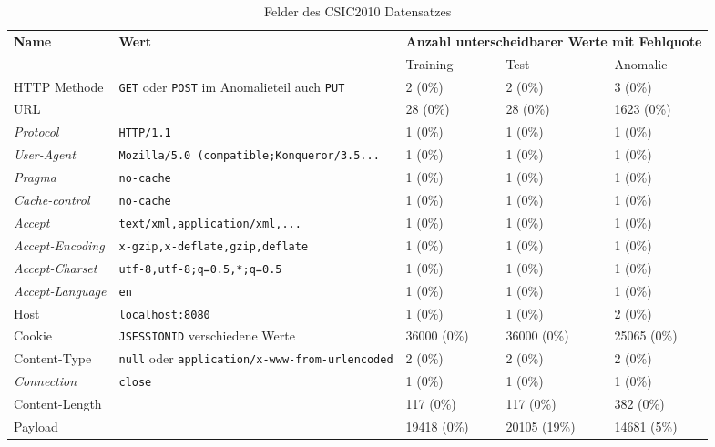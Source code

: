 \begin{sidewaystable}[ht]
  \centering
  \begin{tabular}{lllll}
    \toprule
    \textbf{Name} & \textbf{Wert} & \multicolumn{3}{l}{\textbf{Anzahl unterscheidbarer Werte mit Fehlquote}} \\
     & & Training & Test & Anomalie \\
    \midrule
    HTTP Methode & \verb=GET= oder \verb=POST= im Anomalieteil auch \verb=PUT=  & 2 (0\%) & 2 (0\%) & 3 (0\%)\\
    URL  & & 28 (0\%) & 28 (0\%) & 1623 (0\%)\\
    \emph{Protocol} & \verb=HTTP/1.1= & 1 (0\%) & 1 (0\%) & 1 (0\%)\\
    \emph{User-Agent} & \verb=Mozilla/5.0 (compatible;Konqueror/3.5...= &  1 (0\%) & 1 (0\%) & 1 (0\%)\\
    \emph{Pragma} & \verb=no-cache=  & 1 (0\%) & 1 (0\%) & 1 (0\%)\\
    \emph{Cache-control} & \verb=no-cache=  & 1 (0\%) & 1 (0\%) & 1 (0\%)\\
    \emph{Accept} & \verb=text/xml,application/xml,...= & 1 (0\%) & 1 (0\%) & 1 (0\%)\\
    \emph{Accept-Encoding} & \verb=x-gzip,x-deflate,gzip,deflate= & 1 (0\%) & 1 (0\%) & 1 (0\%)\\
    \emph{Accept-Charset} & \verb!utf-8,utf-8;q=0.5,*;q=0.5! & 1 (0\%) & 1 (0\%) & 1 (0\%)\\
    \emph{Accept-Language} & \verb=en= & 1 (0\%) & 1 (0\%) & 1 (0\%)\\
    Host & \verb=localhost:8080= & 1 (0\%) & 1 (0\%) & 2 (0\%)\\
    Cookie & \verb=JSESSIONID= verschiedene Werte  & 36000 (0\%) & 36000 (0\%) & 25065 (0\%) \\
    Content-Type & \verb=null= oder \verb=application/x-www-from-urlencoded= & 2 (0\%) & 2 (0\%) & 2 (0\%)\\
    \emph{Connection} & \verb=close= & 1 (0\%) & 1 (0\%) & 1 (0\%)\\
    Content-Length & & 117 (0\%) & 117 (0\%) & 382 (0\%)\\
    Payload & & 19418 (0\%) & 20105 (19\%) & 14681 (5\%)\\
    \bottomrule
    \end{tabular}
  \caption{Felder des CSIC2010 Datensatzes}
  \label{tab:csicfields}
\end{sidewaystable}

